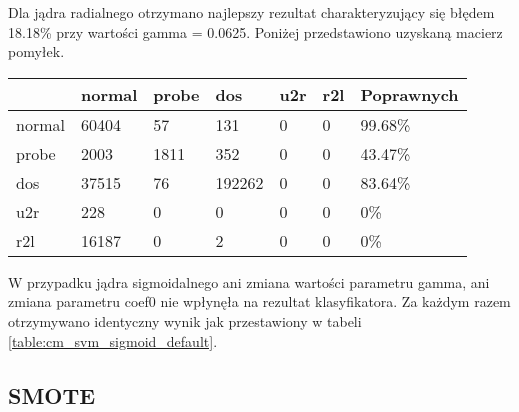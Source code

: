 \documentclass[a4paper, 12pt]{article}
\begin{document}
Dla jądra radialnego otrzymano najlepszy rezultat charakteryzujący się błędem 18.18\% przy wartości gamma = 0.0625. Poniżej przedstawiono uzyskaną macierz pomyłek.

\begin{table}[H]
\centering
\begin{tabular}{ | l | l | l | l | l | l | l | } \hline
	& normal & probe & dos 	& u2r 	& r2l 	& Poprawnych	\\ \hline
normal &  60404 &   57 &  131  & 0  &  0 & 99.68\% \\ \hline
probe  &  2003 & 1811  &  352  &  0 & 0 & 43.47\% \\ \hline
dos    &  37515  &  76 & 192262 &  0  & 0 & 83.64\% \\ \hline
u2r    &    228   &  0   &   0 &  0 & 0 & 0\% \\ \hline
r2l    &  16187   &  0   &   2 &  0 &  0 & 0\% \\ \hline
\end{tabular} 
\end{table}

W przypadku jądra sigmoidalnego ani zmiana wartości parametru gamma, ani zmiana parametru coef0 nie wpłynęła na rezultat klasyfikatora. Za każdym razem otrzymywano identyczny wynik jak przestawiony w tabeli \ref{table:cm_svm_sigmoid_default}.

\subsection{SMOTE}
\label{smote}
\end{document}
